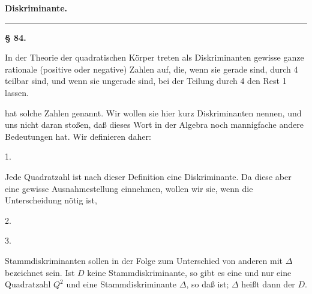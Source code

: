 
\begin{center}

\textbf{\Large Diskriminante.}

\rule{0.3\linewidth}{0.4pt}
\end{center}

\begin{center}
\textbf{§ 84. }
\end{center}

In der Theorie der quadratischen Körper treten als Diskriminanten gewisse ganze rationale (positive oder negative) Zahlen auf, die, wenn sie gerade sind, durch 4 teilbar sind, und wenn sie ungerade sind, bei der Teilung durch 4 den Rest 1 lassen.

 hat solche Zahlen \glqq {}\grqq{} genannt. Wir wollen sie hier kurz Diskriminanten nennen, und uns nicht daran stoßen, daß dieses Wort in der Algebra noch mannigfache andere Bedeutungen hat. Wir definieren daher:

1. 

Jede Quadratzahl ist nach dieser Definition eine Diskriminante. Da diese aber eine gewisse Ausnahmestellung einnehmen, wollen wir sie, wenn die Unterscheidung nötig ist, 

2. 

3. 

Stammdiskriminanten sollen in der Folge zum Unterschied von anderen mit $\Delta$ bezeichnet sein. Ist $D$ keine Stammdiskriminante, so gibt es eine und nur eine Quadratzahl $Q^2$ und eine Stammdiskriminante $\Delta$, so daß
ist; $\Delta$ heißt dann der  $D$.
